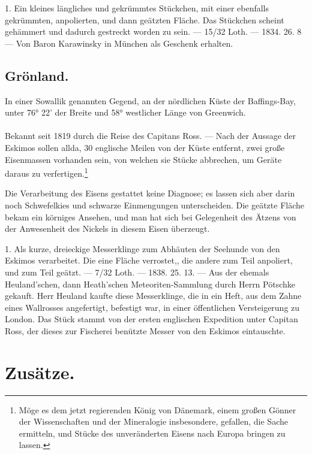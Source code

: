 \documentclass[a4paper, 11pt, oneside, polutonikogreek, german]{article}
\begin{document}
1. Ein kleines längliches und gekrümmtes Stückchen, mit einer ebenfalls gekrümmten, anpolierten, und dann geätzten Fläche. Das Stückchen scheint gehämmert und dadurch gestreckt worden zu sein. — 15/32 Loth. — 1834. 26. 8 — Von Baron Karawinsky in München als Geschenk erhalten.
\subsection{Grönland.}
\begin{center}
\small
In einer Sowallik genannten Gegend, an der nördlichen Küste der Baffings-Bay, unter 76° 22' der Breite und 58° westlicher Länge von Greenwich.
\end{center}
\paragraph{}
Bekannt seit 1819 durch die Reise des Capitans Ross. — Nach der Aussage der Eskimos sollen allda, 30 englische Meilen von der Küste entfernt, zwei große Eisenmassen vorhanden sein, von welchen sie Stücke abbrechen, um Geräte daraus zu verfertigen.\footnote{Möge es dem jetzt regierenden König von Dänemark, einem großen Gönner der Wissenschaften und der Mineralogie insbesondere, gefallen, die Sache ermitteln, und Stücke des unveränderten Eisens nach Europa bringen zu lassen.}

Die Verarbeitung des Eisens gestattet keine Diagnose; es lassen sich aber darin noch Schwefelkies und schwarze Einmengungen unterscheiden. Die geätzte Fläche bekam ein körniges Ansehen, und man hat sich bei Gelegenheit des Ätzens von der Anwesenheit des Nickels in diesem Eisen überzeugt.

1. Als kurze, dreieckige Messerklinge zum Abhäuten der Seehunde von den Eskimos verarbeitet. Die eine Fläche verrostet,, die andere zum Teil anpoliert, und zum Teil geätzt. — 7/32 Loth. — 1838. 25. 13. — Aus der ehemals Heuland'schen, dann Heath'schen Meteoriten-Sammlung durch Herrn Pötschke gekauft. Herr Heuland kaufte diese Messerklinge, die in ein Heft, aus dem Zahne eines Wallrosses angefertigt, befestigt war, in einer öffentlichen Versteigerung zu London. Das Stück stammt von der ersten englischen Expedition unter Capitan Ross, der dieses zur Fischerei benützte Messer von den Eskimos eintauschte.
\clearpage
\section{Zusätze.}
\end{document}
